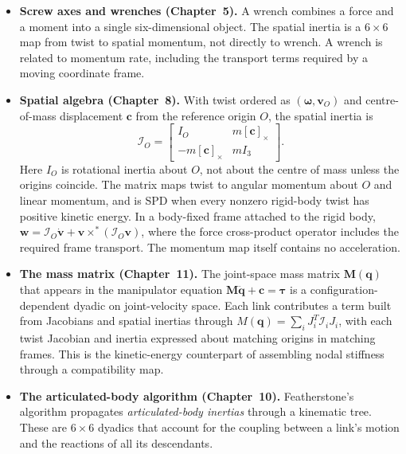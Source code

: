 \begin{itemize}
  \item \textbf{Screw axes and wrenches (Chapter~5).}
    A wrench combines a force and a moment into a single six-dimensional
    object.  The spatial inertia is a $6\times6$ map from twist to spatial momentum, not directly to wrench. A wrench is related to momentum rate, including the transport terms required by a moving coordinate frame.

  \item \textbf{Spatial algebra (Chapter~8).}
    With twist ordered as $(\boldsymbol\omega,\mathbf v_O)$ and centre-of-mass displacement $\mathbf c$ from the reference origin $O$, the spatial inertia is
    \[
    \mathcal I_O=
    \begin{bmatrix}
    I_O&m[\mathbf c]_\times\\
    -m[\mathbf c]_\times&mI_3
    \end{bmatrix}.
    \]
    Here $I_O$ is rotational inertia about $O$, not about the centre of mass unless the origins coincide. The matrix maps twist to angular momentum about $O$ and linear momentum, and is SPD when every nonzero rigid-body twist has positive kinetic energy. In a body-fixed frame attached to the rigid body,
    $\mathbf w=\mathcal I_O\dot{\mathbf v}+\mathbf v\times^*(\mathcal I_O\mathbf v)$,
    where the force cross-product operator includes the required frame transport. The momentum map itself contains no acceleration.

  \item \textbf{The mass matrix (Chapter~11).}
    The joint-space mass matrix $\mathbf{M}(\mathbf{q})$ that appears
    in the manipulator equation
    $\mathbf{M}\ddot{\mathbf{q}}+\mathbf{c}=\boldsymbol{\tau}$
    is a configuration-dependent dyadic on joint-velocity space.
    Each link contributes a term built from Jacobians and spatial
    inertias through $M(\mathbf q)=\sum_i J_i^T\mathcal I_iJ_i$, with each twist Jacobian and inertia expressed about matching origins in matching frames. This is the kinetic-energy counterpart of assembling nodal stiffness through a compatibility map.

  \item \textbf{The articulated-body algorithm (Chapter~10).}
    Featherstone's algorithm propagates \emph{articulated-body inertias}
    through a kinematic tree.  These are $6\times6$ dyadics that
    account for the coupling between a link's motion and the
    reactions of all its descendants.
\end{itemize}

